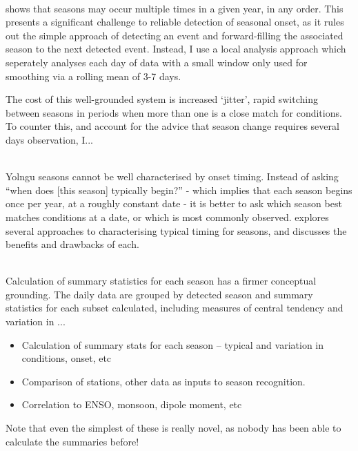 ~\\

 shows that seasons may occur multiple
times in a given year, in any order.  This presents a significant
challenge to reliable detection of seasonal onset, as it rules out
the simple approach of detecting an event and forward-filling the
associated season to the next detected event.  Instead, I use a local
analysis approach which seperately analyses each day of data with
a small window only used for smoothing via a rolling mean of 3-7 days.

The cost of this well-grounded system is increased `jitter', rapid
switching between seasons in periods when more than one is a close
match for conditions.  To counter this, and account for the advice
that season change requires several days observation, I...\\


~\\

Yolngu seasons cannot be well characterised by onset timing.  Instead
of asking ``when does [this season] typically begin?'' - which implies
that each season begins once per year, at a roughly constant date -
it is better to ask which season best matches conditions at a date,
or which is most commonly observed.
%
 explores several approaches
to characterising typical timing for seasons, and discusses the
benefits and drawbacks of each.

~\\

Calculation of summary statistics for each season has a firmer conceptual
grounding.  The daily data are grouped by detected season and summary statistics
for each subset calculated, including measures of central tendency and
variation in ...
\begin{itemize}
\item Calculation of summary stats for each season – typical and variation in conditions, onset, etc
\item Comparison of stations, other data as inputs to season recognition.
\item Correlation to ENSO, monsoon, dipole moment, etc
\end{itemize}

Note that even the simplest of these is really novel, as nobody has
been able to calculate the summaries before!

